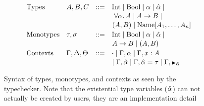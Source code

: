 \begin{figure}[h]
  \centering
  \begin{minipage}{0.518\textwidth}
  \[
      \begin{array}{llcl}
      \text{Types} & A, B, C & \bnfas &
            \Inttype \bnfalt \Booltype \bnfalt \alpha \bnfalt \ahat \bnfalt 
            \\[1pt] &&&\!\!\!\;\;\;
            \alltype{\alpha}{A} \bnfalt A \arr B \bnfalt
            \\[1pt] &&&\!\!\!\;\;
            (A, B) \bnfalt
            \Unionname[A_1, \dots, A_n]
      \\[2pt]
      \text{Monotypes} & \tau,\sigma & \bnfas &
            \Inttype \bnfalt \Booltype \bnfalt \alpha \bnfalt \ahat \bnfalt 
            \\[1pt] &&&\!\!\!\;\;
            A \arr B \bnfalt (A, B)
        \\[2pt]
      \text{Contexts} & \Gamma, \Delta, \Theta & \bnfas &
                  \cdot
                  \bnfalt \Gamma, \alpha 
                  \bnfalt \Gamma, x:A
                  \\[1pt] &&&\!\!\!\;\;
                  \bnfalt \Gamma, \ahat
                  \bnfalt \Gamma, \hypeq{\ahat}{\tau}
                  \bnfalt \Gamma, \MonnierComma{\ahat}
      \end{array}
  \]
  
  \captionsetup{justification=centering}\caption{Syntax of types, monotypes, and contexts as seen by the typechecker. Note that the existential type variables ($\hat{\alpha}$) can not actually be created by users, they are an implementation detail}


\end{minipage}
\end{figure}

